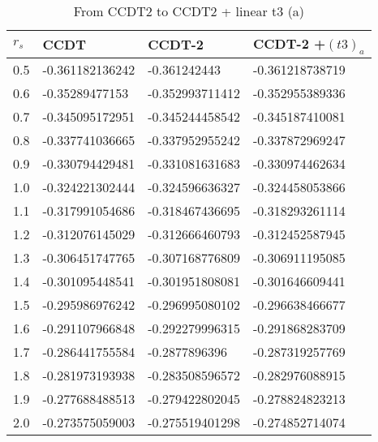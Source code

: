 \begin{table}[h]
\caption{From CCDT2 to CCDT2 + linear t3 (a)}
\begin{center}
\begin{threeparttable}
\begin{tabular}{l l l l}
    \toprule
$r_s$ & CCDT & CCDT-2 & CCDT-2 +$(t3)_a$  \\ \hline
0.5 & -0.361182136242 & -0.361242443 & -0.361218738719   \\
0.6 & -0.35289477153 & -0.352993711412 & -0.352955389336   \\
0.7 & -0.345095172951 & -0.345244458542 & -0.345187410081   \\
0.8 & -0.337741036665 & -0.337952955242 & -0.337872969247   \\
0.9 & -0.330794429481 & -0.331081631683 & -0.330974462634   \\
1.0 & -0.324221302444 & -0.324596636327 & -0.324458053866   \\
1.1 & -0.317991054686 & -0.318467436695 & -0.318293261114  \\
1.2 & -0.312076145029 & -0.312666460793 & -0.312452587945   \\
1.3 & -0.306451747765 & -0.307168776809 & -0.306911195085  \\
1.4 & -0.301095448541 & -0.301951808081 & -0.301646609441   \\
1.5 & -0.295986976242 & -0.296995080102 & -0.296638466677   \\
1.6 & -0.291107966848 & -0.292279996315 & -0.291868283709   \\
1.7 & -0.286441755584 & -0.2877896396 & -0.287319257769  \\
1.8 & -0.281973193938 & -0.283508596572 & -0.282976088915   \\
1.9 & -0.277688488513 & -0.279422802045 & -0.278824823213   \\
2.0 & -0.273575059003 & -0.275519401298 & -0.274852714074   \\
\bottomrule
\end{tabular}
\begin{tablenotes}
\end{tablenotes}
\end{threeparttable}
\end{center}
\label{tab:ccd2_to_ccdt3_1}
\end{table}

